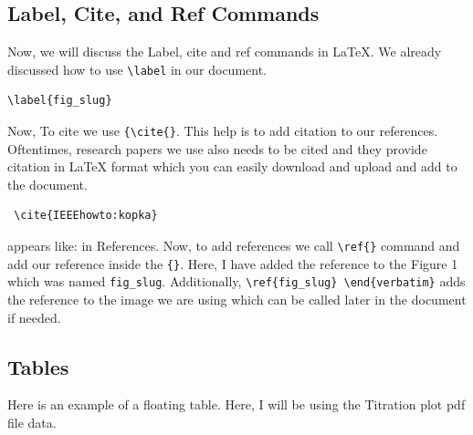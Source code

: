 \documentclass[12pt,journal,compsoc]{IEEEtran}
\begin{document}
\subsection{Label, Cite, and Ref Commands}
Now, we will discuss the Label, cite and ref commands in LaTeX. We already discussed how to use \verb|\label| in our document.  
\begin{verbatim}
\label{fig_slug} 
\end{verbatim} 

Now, To cite we use \verb|{\cite{}|.
This help is to add citation to our references. Oftentimes, research papers we use also needs to be cited and they provide citation in LaTeX format which you can easily download and upload and add to the document. 
\begin{verbatim} \cite{IEEEhowto:kopka} \end{verbatim} appears like: \cite{IEEEhowto:kopka} in References.
Now, to add references we call \verb|\ref{}| command and add our reference inside the \verb|{}|. Here, I have added the reference to the Figure 1 which was named \verb|fig_slug|. Additionally, \verb|\ref{fig_slug} \end{verbatim}| adds the reference to the image we are using which can be called later in the document if needed.

\subsection{Tables}
Here is an example of a floating table. Here, I will be using the Titration plot pdf file data. 
\end{document}

